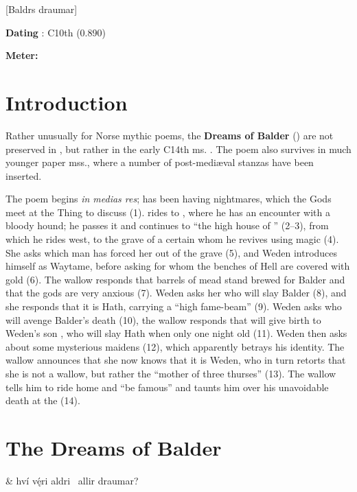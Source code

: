 [Baldrs draumar]

\begin{flushright}%
\textbf{Dating} \parencite{Sapp2022}: C10th (0.890)

\textbf{Meter:} \Fornyrdislag%
\end{flushright}

\section{Introduction}

Rather unusually for Norse mythic poems, the \textbf{Dreams of Balder} (\Baldrsdraumar) are not preserved in \Regius, but rather in the early C14th ms. \AM.  The poem also survives in much younger paper mss., where a number of post-mediæval stanzas have been inserted.

The poem begins \emph{in medias res};  has been having nightmares, which the Gods meet at the Thing to discuss (1).   rides to , where he has an encounter with a bloody hound; he passes it and continues to “the high house of ” (2–3), from which he rides west, to the grave of a certain  whom he revives using magic (4). She asks which man has forced her out of the grave (5), and Weden introduces himself as Waytame, before asking for whom the benches of Hell are covered with gold (6). The wallow responds that barrels of mead stand brewed for Balder and that the gods are very anxious (7). Weden asks her who will slay Balder (8), and she responds that it is Hath, carrying a “high fame-beam” (9).  Weden asks who will avenge Balder’s death (10), the wallow responds that  will give birth to Weden’s son , who will slay Hath when only one night old (11).  Weden then asks about some mysterious maidens (12), which apparently betrays his identity.  The wallow announces that she now knows that it is Weden, who in turn retorts that she is not a wallow, but rather the “mother of three thurses” (13). The wallow tells him to ride home and “be famous” and taunts him over his unavoidable death at the  (14).

\sectionline

\section{The Dreams of Balder}

\bvg\bva{}%
 &
hví vę́ri aldri \hld\ allir draumar?\eva

